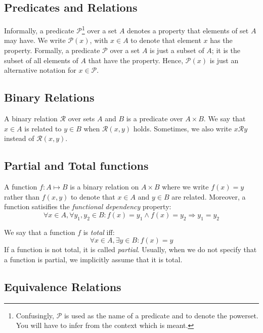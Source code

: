 \subsection*{Predicates and Relations}

Informally, a predicate $\mathcal{P}$\footnote{Confusingly, $\mathcal{P}$ is
used as the name of a predicate and to denote the powerset. You will have to
infer from the context which is meant.} over a set $A$ denotes a property that
elements of set $A$ may have. We write $\mathcal{P}(x)$, with $x \in A$ to denote that
element $x$ has the property. Formally, a predicate $\mathcal{P}$ over a set
$A$ is just a subset of $A$; it is the subset of all elements of $A$ that have
the property. Hence, $\mathcal{P}(x)$ is just an alternative notation for $x \in \mathcal{P}$.

\subsection*{Binary Relations}

A binary relation $\mathcal{R}$ over sets $A$ and $B$ is a predicate over $A
\times B$. We say that $x \in A$ is related to $y \in B$ when
$\mathcal{R}(x,y)$ holds. Sometimes, we also write $x\mathcal{R}y$ instead of
$\mathcal{R}(x,y)$.

\subsection*{Partial and Total functions}

A function $f: A \mapsto B$ is a binary relation on $A \times B$ where
we write $f(x) = y$ rather than $f(x,y)$ to denote that $x \in A$ and $y \in B$
are related. Moreover, a function satisifies the \emph{functional dependency}
property:
\[ \forall x \in A, \forall y_1, y_2 \in B: f(x) = y_1 \wedge f(x) = y_2 \Rightarrow y_1 = y_2 \]

We say that a function $f$ is \emph{total} iff:
\[ \forall x \in A, \exists y \in B: f(x) = y \]
If a function is not total, it is called \emph{partial}. Usually, when we do
not specify that a function is partial, we implicitly assume that it is total.

\subsection*{Equivalence Relations}

